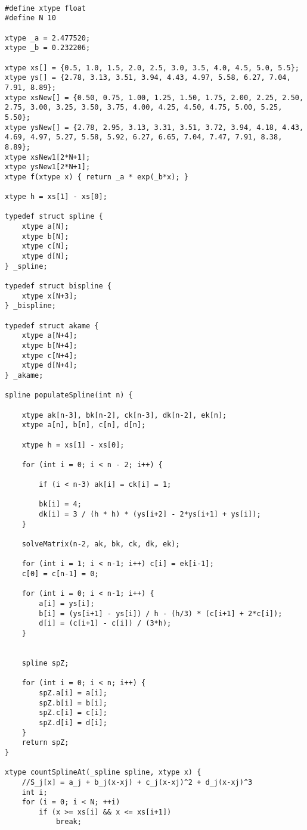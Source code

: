 \documentclass[12pt]{article}
\begin{document}
    {
        \lstset{basicstyle=\tiny}
        \begin{lstlisting}

#define xtype float
#define N 10

xtype _a = 2.477520;
xtype _b = 0.232206;

xtype xs[] = {0.5, 1.0, 1.5, 2.0, 2.5, 3.0, 3.5, 4.0, 4.5, 5.0, 5.5};
xtype ys[] = {2.78, 3.13, 3.51, 3.94, 4.43, 4.97, 5.58, 6.27, 7.04, 7.91, 8.89};
xtype xsNew[] = {0.50, 0.75, 1.00, 1.25, 1.50, 1.75, 2.00, 2.25, 2.50, 2.75, 3.00, 3.25, 3.50, 3.75, 4.00, 4.25, 4.50, 4.75, 5.00, 5.25, 5.50};
xtype ysNew[] = {2.78, 2.95, 3.13, 3.31, 3.51, 3.72, 3.94, 4.18, 4.43, 4.69, 4.97, 5.27, 5.58, 5.92, 6.27, 6.65, 7.04, 7.47, 7.91, 8.38, 8.89};
xtype xsNew1[2*N+1];
xtype ysNew1[2*N+1];
xtype f(xtype x) { return _a * exp(_b*x); }

xtype h = xs[1] - xs[0];

typedef struct spline {
    xtype a[N];
    xtype b[N];
    xtype c[N];
    xtype d[N];
} _spline;

typedef struct bispline {
    xtype x[N+3];
} _bispline;

typedef struct akame {
    xtype a[N+4];
    xtype b[N+4];
    xtype c[N+4];
    xtype d[N+4];
} _akame;

spline populateSpline(int n) {

    xtype ak[n-3], bk[n-2], ck[n-3], dk[n-2], ek[n];
    xtype a[n], b[n], c[n], d[n];

    xtype h = xs[1] - xs[0];

    for (int i = 0; i < n - 2; i++) {

        if (i < n-3) ak[i] = ck[i] = 1;

        bk[i] = 4;
        dk[i] = 3 / (h * h) * (ys[i+2] - 2*ys[i+1] + ys[i]);
    }

    solveMatrix(n-2, ak, bk, ck, dk, ek);

    for (int i = 1; i < n-1; i++) c[i] = ek[i-1];
    c[0] = c[n-1] = 0;
    
    for (int i = 0; i < n-1; i++) {
        a[i] = ys[i];
        b[i] = (ys[i+1] - ys[i]) / h - (h/3) * (c[i+1] + 2*c[i]);
        d[i] = (c[i+1] - c[i]) / (3*h);
    }


    spline spZ;

    for (int i = 0; i < n; i++) {
        spZ.a[i] = a[i];
        spZ.b[i] = b[i];
        spZ.c[i] = c[i];
        spZ.d[i] = d[i];
    }
    return spZ;
}

xtype countSplineAt(_spline spline, xtype x) {
    //S_j[x] = a_j + b_j(x-xj) + c_j(x-xj)^2 + d_j(x-xj)^3
    int i;
    for (i = 0; i < N; ++i)
        if (x >= xs[i] && x <= xs[i+1])
            break;


\end{lstlisting}}
\end{document}
